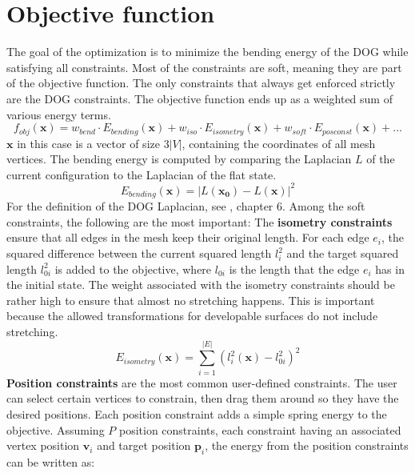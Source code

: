 \documentclass[a4paper,twoside,12pt,nochapterprefix]{scrbook}
\begin{document}
\section{Objective function}\label{sec:objective}
The goal of the optimization is to minimize the bending energy of the DOG while satisfying all constraints. Most of the constraints are soft, meaning they are part of the objective function. The only constraints that always get enforced strictly are the DOG constraints. The objective function ends up as a weighted sum of various energy terms.
\begin{equation}
f_{obj}(\mathbf{x}) = w_{bend} \cdot E_{bending}(\mathbf{x}) + w_{iso} \cdot E_{isometry}(\mathbf{x}) + w_{soft} \cdot E_{posconst}(\mathbf{x}) + ...
\end{equation}
$\mathbf{x}$ in this case is a vector of size $3|V|$, containing the coordinates of all mesh vertices.\newline
The bending energy is computed by comparing the Laplacian $L$ of the current configuration to the Laplacian of the flat state.
\begin{equation}
E_{bending}(\mathbf{x}) = |L(\mathbf{x_0}) - L(\mathbf{x})|^2
\end{equation}
For the definition of the DOG Laplacian, see \cite{Rabinovich:DogShapeSpace:2018}, chapter 6.\newline
Among the soft constraints, the following are the most important:\newline
The \textbf{isometry constraints} ensure that all edges in the mesh keep their original length. For each edge $e_i$, the squared difference between the current squared length $l_i^2$ and the target squared length $l_{0i}^2$ is added to the objective, where $l_{0i}$ is the length that the edge $e_i$ has in the initial state. The weight associated with the isometry constraints should be rather high to ensure that almost no stretching happens. This is important because the allowed transformations for developable surfaces do not include stretching.
\begin{equation}
E_{isometry}(\mathbf{x}) = \sum_{i = 1}^{|E|} (l_i^2(\mathbf{x}) - l_{0i}^2)^2
\end{equation}
\textbf{Position constraints} are the most common user-defined constraints. The user can select certain vertices to constrain, then drag them around so they have the desired positions. Each position constraint adds a simple spring energy to the objective. Assuming $P$ position constraints, each constraint having an associated vertex position $\mathbf{v}_i$ and target position $\mathbf{p}_i$, the energy from the position constraints can be written as:
\end{document}
